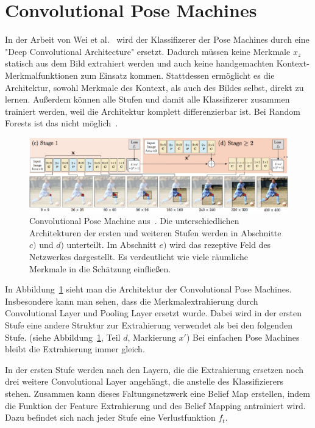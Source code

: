 \documentclass[journal, a4paper]{IEEEtran}
\begin{document}
\section{Convolutional Pose Machines}\label{subsec:Intro}
	In der Arbeit von Wei et al.~\cite{conv_pose} wird der Klassifizerer der Pose Machines durch eine "Deep Convolutional Architecture" ersetzt. Dadurch müssen keine Merkmale $x_z$ statisch aus dem Bild extrahiert werden und auch keine handgemachten Kontext-Merkmalfunktionen zum Einsatz kommen. Stattdessen ermöglicht es die Architektur, sowohl Merkmale des Kontext, als auch des Bildes selbst, direkt zu lernen. Außerdem können alle Stufen und damit alle Klassifizerer zusammen trainiert werden, weil die Architektur komplett differenzierbar ist. Bei Random Forests ist das nicht möglich~\cite{ramakrishna2014pose}.

        \begin{figure}[!bth]
                \begin{center}
                \includegraphics[width=1\columnwidth]{convolutional_pose_machine.png}
                \caption{Convolutional Pose Machine aus~\cite{conv_pose}. Die unterschiedlichen Architekturen der ersten und weiteren Stufen werden in Abschnitte $c)$ und $d)$ unterteilt. Im Abschnitt $e)$ wird das rezeptive Feld des Netzwerkes dargestellt. Es verdeutlicht wie viele räumliche Merkmale in die Schätzung einfließen.}
                \label{fig:conv_pose_machine}
                \end{center}
        \end{figure}

        In Abbildung~\ref{fig:conv_pose_machine} sieht man die Architektur der Convolutional Pose Machines. Insbesondere kann man sehen, dass die Merkmalextrahierung durch Convolutional Layer und Pooling Layer ersetzt wurde. Dabei wird in der ersten Stufe eine andere Struktur zur Extrahierung verwendet als bei den folgenden Stufe. (siehe Abbildung~\ref{fig:conv_pose_machine}, Teil $d$, Markierung $x'$) Bei einfachen Pose Machines bleibt die Extrahierung immer gleich. 

        In der ersten Stufe werden nach den Layern, die die Extrahierung ersetzen noch drei weitere Convolutional Layer angehängt, die anstelle des Klassifizierers stehen. Zusammen kann dieses Faltungsnetzwerk eine Belief Map erstellen, indem die Funktion der Feature Extrahierung und des Belief Mapping antrainiert wird. Dazu befindet sich nach jeder Stufe eine Verlustfunktion $f_{t}$.
\end{document}
